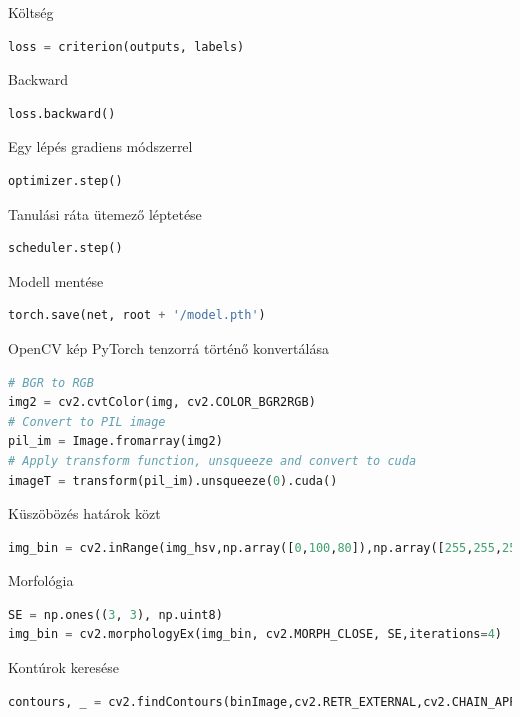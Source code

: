 \documentclass[12pt,a4paper,oneside]{report}             %
\begin{document}
Költség

\begin{lstlisting}[language=Python]
loss = criterion(outputs, labels)
\end{lstlisting}

Backward

\begin{lstlisting}[language=Python]
loss.backward()
\end{lstlisting}

Egy lépés gradiens módszerrel

\begin{lstlisting}[language=Python]
optimizer.step()
\end{lstlisting}

Tanulási ráta ütemező léptetése

\begin{lstlisting}[language=Python]
scheduler.step()
\end{lstlisting}

Modell mentése

\begin{lstlisting}[language=Python]
torch.save(net, root + '/model.pth')
\end{lstlisting}

OpenCV kép PyTorch tenzorrá történő konvertálása

\begin{lstlisting}[language=Python]
# BGR to RGB
img2 = cv2.cvtColor(img, cv2.COLOR_BGR2RGB)
# Convert to PIL image
pil_im = Image.fromarray(img2)
# Apply transform function, unsqueeze and convert to cuda
imageT = transform(pil_im).unsqueeze(0).cuda()
\end{lstlisting}

Küszöbözés határok közt

\begin{lstlisting}[language=Python]
img_bin = cv2.inRange(img_hsv,np.array([0,100,80]),np.array([255,255,255]))
\end{lstlisting}

Morfológia

\begin{lstlisting}[language=Python]
SE = np.ones((3, 3), np.uint8)
img_bin = cv2.morphologyEx(img_bin, cv2.MORPH_CLOSE, SE,iterations=4)
\end{lstlisting}

Kontúrok keresése

\begin{lstlisting}[language=Python]
contours, _ = cv2.findContours(binImage,cv2.RETR_EXTERNAL,cv2.CHAIN_APPROX_SIMPLE)
\end{lstlisting}
\end{document}
